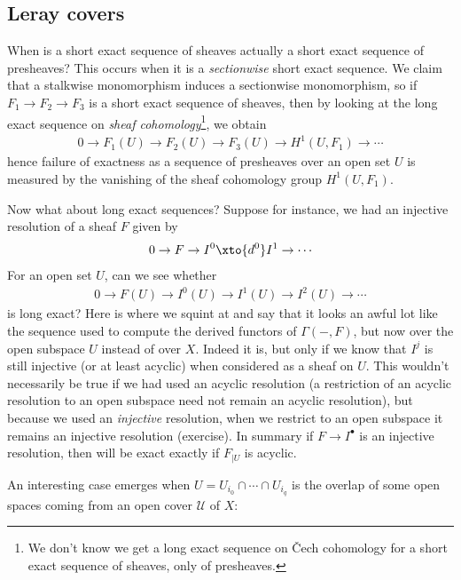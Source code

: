\documentclass[11pt]{book}
\begin{document}
\subsection{Leray covers}
When is a short exact sequence of sheaves actually a short exact sequence of presheaves? This occurs when it is a \emph{sectionwise} short exact sequence. We claim that a stalkwise monomorphism induces a sectionwise monomorphism, so if $F_1 \to F_2 \to F_3$ is a short exact sequence of sheaves, then by looking at the long exact sequence on \emph{sheaf cohomology}\footnote{We don't know we get a long exact sequence on \v{C}ech cohomology for a short exact sequence of sheaves, only of presheaves.}, we obtain
\begin{align*}
    0 \to F_1(U) \to F_2(U) \to F_3(U) \to H^1(U,F_1) \to \cdots 
\end{align*}
hence failure of exactness as a sequence of presheaves over an open set $U$ is measured by the vanishing of the sheaf cohomology group $H^1(U,F_1)$.

Now what about long exact sequences? Suppose for instance, we had an injective resolution of a sheaf $F$ given by
\begin{align*}
    0 \to F \to I^0 \xto{d^0} I^1 \to \cdots
\end{align*}
For an open set $U$, can we see whether
\begin{equation}\label{eqn:acyclic-resolution-on-U}
\begin{aligned}
    0 \to F(U) \to I^0(U) \to I^1(U) \to I^2(U) \to \cdots
\end{aligned}
\end{equation}
is long exact? Here is where we squint at  and say that it looks an awful lot like the sequence used to compute the derived functors of $\Gamma(-,F)$, but now over the open subspace $U$ instead of over $X$. Indeed it is, but only if we know that $I^j$ is still injective (or at least acyclic) when considered as a sheaf on $U$. This wouldn't necessarily be true if we had used an acyclic resolution (a restriction of an acyclic resolution to an open subspace need not remain an acyclic resolution), but because we used an \emph{injective} resolution, when we restrict to an open subspace it remains an injective resolution (exercise). In summary if $F \to I^\bullet$ is an injective resolution, then  will be exact exactly if $F_{|U}$ is acyclic.

An interesting case emerges when $U = U_{i_0}\cap \cdots \cap U_{i_q}$ is the overlap of some open spaces coming from an open cover $\mathcal{U}$ of $X$:
\end{document}
